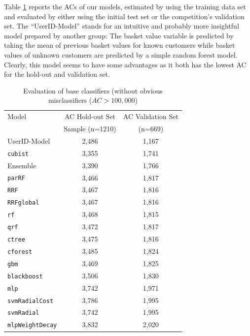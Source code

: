 \documentclass[12pt]{article}
\begin{document}
Table \ref{tab:compres} reports the ACs of our models, estimated by using the training data set and evaluated by either using the initial test set or the competition's validation set. The ``UserID-Model'' stands for an intuitive and probably more insightful model prepared by another group: The basket value variable is predicted by taking the mean of previous basket values for known customers while basket values of unknown customers are predicted by a simple random forest model. Clearly, this model seems to have some advantages as it both has the lowest AC for the hold-out and validation set.\\
\begin{table}
	\centering
	\begin{tabular}{l|cc}
		\hline
		\hline
		Model & AC Hold-out Set & AC Validation Set \\
		& Sample (n=1210)  &  (n=669) \\\hline
		UserID-Model & 2,486 & 1,167 \\
		\texttt{cubist} & 3,355 & 1,741\\
		Ensemble & 3,390 & 1,766 \\
		\texttt{parRF} & 3,466 & 1,817 \\
		\texttt{RRF} & 3,467 & 1,816\\
		\texttt{RRFglobal} & 3,467 & 1,816\\
		\texttt{rf} & 3,468 & 1,815\\
		\texttt{qrf} & 3,472 & 1,817\\
		\texttt{ctree} & 3,475 & 1,816\\
		\texttt{cforest} & 3,485 & 1,824\\
		\texttt{gbm }& 3,469 & 1,825\\
		\texttt{blackboost} & 3,506 & 1,830\\
		\texttt{mlp} & 3,742 & 1,971\\
		\texttt{svmRadialCost} & 3,786 & 1,995\\
		\texttt{svmRadial} & 3,742 & 1,995\\
		\texttt{mlpWeightDecay} & 3,832 & 2,020\\
		\hline
		\hline
	\end{tabular}
	\caption{Evaluation of base classifiers (without obvious misclassifiers ($AC > 100,000$)}
	\label{tab:compres}
\end{table}
\end{document}
